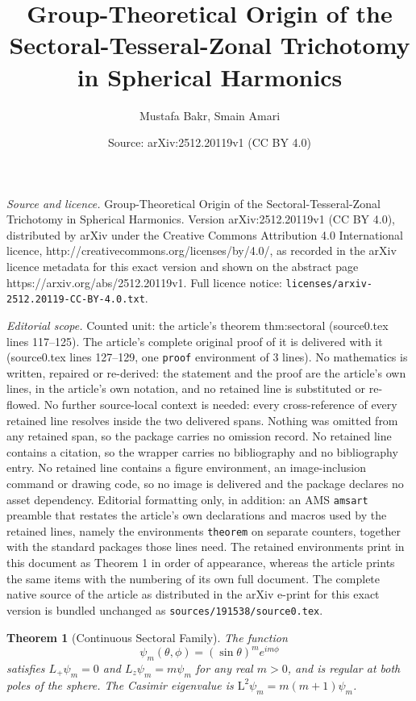 \documentclass[10pt,a4paper]{amsart}
\title{Group-Theoretical Origin of the Sectoral-Tesseral-Zonal Trichotomy in Spherical Harmonics}
\author{Mustafa Bakr, Smain Amari}
\date{Source: arXiv:2512.20119v1 (CC BY 4.0)}
\newtheorem{theorem}{Theorem}
\begin{document}
\maketitle

\noindent\emph{Source and licence.} Group-Theoretical Origin of the Sectoral-Tesseral-Zonal Trichotomy in Spherical Harmonics. Version arXiv:2512.20119v1 (CC BY 4.0), distributed by arXiv under the Creative Commons Attribution 4.0 International licence, http://creativecommons.org/licenses/by/4.0/, as recorded in the arXiv licence metadata for this exact version and shown on the abstract page https://arxiv.org/abs/2512.20119v1. Full licence notice: \texttt{licenses/arxiv-2512.20119-CC-BY-4.0.txt}.\par\smallskip

\noindent\textit{Editorial scope.} Counted unit: the article's theorem thm:sectoral (source0.tex lines 117--125). The article's complete original proof of it is delivered with it (source0.tex lines 127--129, one \texttt{proof} environment of 3 lines). No mathematics is written, repaired or re-derived: the statement and the proof are the article's own lines, in the article's own notation, and no retained line is substituted or re-flowed.  No further source-local context is needed: every cross-reference of every retained line resolves inside the two delivered spans.  Nothing was omitted from any retained span, so the package carries no omission record.  No retained line contains a citation, so the wrapper carries no bibliography and no bibliography entry.  No retained line contains a figure environment, an image-inclusion command or drawing code, so no image is delivered and the package declares no asset dependency.  Editorial formatting only, in addition: an AMS \texttt{amsart} preamble that restates the article's own declarations and macros used by the retained lines, namely the environments \texttt{theorem} on separate counters, together with the standard packages those lines need.  The retained environments print in this document as Theorem 1 in order of appearance, whereas the article prints the same items with the numbering of its own full document.  The complete native source of the article as distributed in the arXiv e-print for this exact version is bundled unchanged as \texttt{sources/191538/source0.tex}.
\begin{theorem}[Continuous Sectoral Family]
\label{thm:sectoral}
The function
\begin{equation}
\psi_m(\theta, \phi) = (\sin\theta)^m e^{im\phi}
\label{eq:full_sectoral}
\end{equation}
satisfies $L_+ \psi_m = 0$ and $L_z \psi_m = m\psi_m$ for any real $m > 0$, and is regular at both poles of the sphere. The Casimir eigenvalue is $\mathrm{L}^2 \psi_m = m(m+1)\psi_m$.
\end{theorem}
\end{document}
